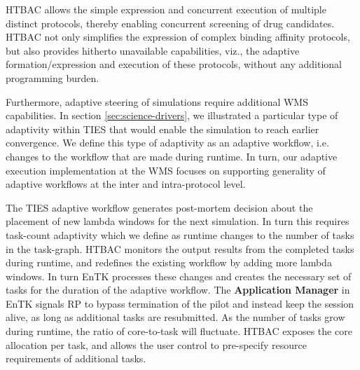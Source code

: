 HTBAC allows the simple expression and concurrent execution of multiple
distinct protocols, thereby enabling concurrent screening of drug candidates.
HTBAC not only simplifies the expression of complex binding affinity
protocols, but also provides hitherto unavailable capabilities, viz., the
adaptive formation/expression and execution of these protocols, without any
additional programming burden. 

Furthermore, adaptive steering of simulations require additional WMS capabilities. 
In section \ref{sec:science-drivers}, we illustrated a particular type of adaptivity 
within TIES that would enable the simulation to reach earlier convergence.
We define this type of adaptivity as an adaptive workflow, i.e. changes to the 
workflow that are made during runtime. In turn, our 
adaptive execution implementation at the WMS focuses on supporting generality of 
adaptive workflows at the inter and intra-protocol level. 

The TIES adaptive workflow generates post-mortem decision about the placement
of new lambda windows for the next simulation. In turn this requires task-count 
adaptivity which we define as runtime changes to the
number of tasks in the task-graph. HTBAC monitors the output results from the 
completed tasks during runtime, and redefines the existing workflow by adding
more lambda windows. In turn EnTK processes these changes and creates the necessary
set of tasks for the duration of the adaptive workflow. The \textbf{Application
Manager} in EnTK signals RP to bypass termination of the pilot and instead keep the
session alive, as long as additional tasks are resubmitted. 
As the number of tasks grow during runtime, the ratio of core-to-task will fluctuate. 
HTBAC exposes the core allocation per task, 
and allows the user control to pre-specify resource requirements of additional tasks.





